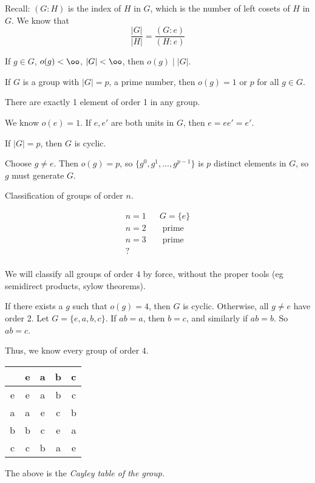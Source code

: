 \documentclass[x11names,reqno,14pt]{extarticle}
\begin{document}
Recall: $(G:H)$ is the index of $H$ in $G$, which is the number of left cosets of $H$ in $G$. We know that
\[
\frac{|G|}{|H|} = \frac{(G:e)}{(H:e)}
\]

\cor

If $g \in G$, $o(g) < \oo$, $|G|<\oo$, then $o(g) \mid |G|$. 

\cor If $G$ is a group with $|G| = p$, a prime number, then $o(g) = 1$ or $p$ for all $g \in G$. 

\lem

There are exactly 1 element of order 1 in any group. 

\proof

We know $o(e) = 1$. If $e, e'$ are both units in $G$, then $e =ee' = e'$. 

\cor

If $|G| = p$, then $G$ is cyclic. 

\proof Choose $g \neq e$. Then $o(g) = p$, so $\{g^0,g^1,\dots, g^{p - 1}\}$ is $p$ distinct elements in $G$, so $g$ must generate $G$. 

Classification of groups of order $n$. 

\begin{align*}
n = 1 & &G = \{e\} \\
n = 2 & &\text{ prime} \\
n = 3 & &\text{ prime} \\
? \\
\end{align*}

We will classify all groups of order $4$ by force, without the proper tools (eg semidirect products, sylow theorems). 

If there exists a $g$ such that $o(g) = 4$, then $G$ is cyclic. Otherwise, all $g \neq e$ have order 2. Let $G = \{e, a, b, c\}$. If $ab = a$, then $b = c$, and similarly if $ab = b$. So $ab = c$. 

Thus, we know every group of order $4$. 

\begin{center}
\begin{tabular}{c | c c c c }
 & e & a & b & c \\
\hline
e & e & a & b & c \\
a & a & e & c & b \\
b & b & c & e & a \\
c & c & b & a & e \\
\end{tabular}
\end{center}
The above is the \it{Cayley table} of the group. 
\end{document}
